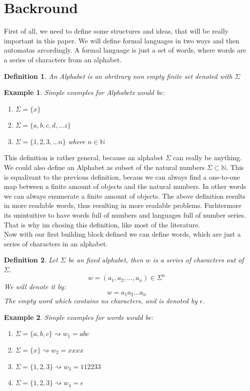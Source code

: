 \documentclass[12pt,letterpaper]{article}
\newtheorem{definition}{Definition}
\newtheorem{example}{Example}[section]
\begin{document}
\section{Backround}
First of all, we need to define some structures and ideas,
that will be really important in this paper. We will define 
formal languages in two ways and then automatas arcordingly.
A formal language is just a set of words, where words are 
a series of characters from an alphabet.
\begin{definition}
  An Alphabet is an abritrary non empty finite set denoted with $\Sigma$
\end{definition}
\begin{example} Simple examples for Alphabets would be:
  \begin{enumerate}
    \item $\Sigma = \{x\}$
    \item $\Sigma = \{a,b,c,d, \dots z \}$
    \item $\Sigma = \{1,2,3, \dots n \}$ where $n \in \mathbb{N}$
  \end{enumerate}
\end{example}
This definition is rather general, because an alphabet $\Sigma$
can really be anything. We could also define an Alphabet as subset of
the natural numbers $\Sigma \subset \mathbb{N}$. This is equalivant to
the previous definition, becaus we can always find a one-to-one map between
a finite amount of objects and the natural numbers. In other words 
we can always enumerate a finite amount of objects. The above definition
results in more readable words, thus resulting in more readable problems.
Furhtermore its unintuitive to have words full of numbers and languages
full of number series. That is why im chosing this definition, like most
of the literature.\\
Now with our first building block defined we can define words, which are just
a series of characters in an alphabet.
\begin{definition}
  Let $\Sigma$ be an fixed alphabet, then $w$ is a series of characters out of
  $\Sigma$. 
  \[
    w = (a_1,a_2, \dots, a_n) \in \Sigma^n
  \]
  We will denote it by:
  \[
    w = a_1a_2\dots a_n
  \]
  The empty word which contains no characters, 
  and is denoted by $\epsilon$.
\end{definition}
\begin{example}
  Simple examples for words would be:
  \begin{enumerate}
    \item $\Sigma = \{a,b,c\} \rightsquigarrow w_1 = abc$
    \item $\Sigma = \{x\} \rightsquigarrow w_2 = xxxx$
    \item $\Sigma = \{1,2,3\} \rightsquigarrow w_3 = 112233$
    \item $\Sigma = \{1,2,3\} \rightsquigarrow w_4 = \epsilon$
  \end{enumerate}
\end{example}
\end{document}
